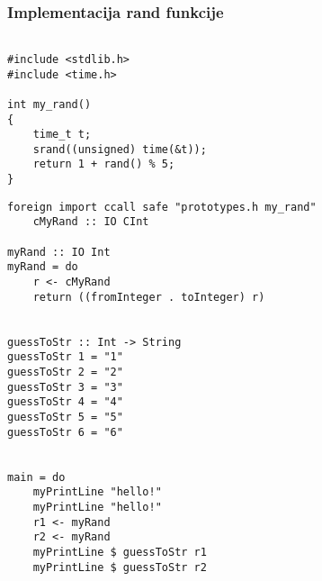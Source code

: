 \documentclass{beamer}
\begin{document}
\begin{frame}[fragile]
\frametitle{Implementacija rand funkcije}
\begin{lstlisting}

#include <stdlib.h>
#include <time.h>

int my_rand() 
{
	time_t t; 
	srand((unsigned) time(&t));
	return 1 + rand() % 5;
}

\end{lstlisting}
\end{frame}

\begin{frame}[fragile]
\begin{lstlisting}
foreign import ccall safe "prototypes.h my_rand"
    cMyRand :: IO CInt

myRand :: IO Int
myRand = do
    r <- cMyRand
    return ((fromInteger . toInteger) r)


guessToStr :: Int -> String
guessToStr 1 = "1"
guessToStr 2 = "2"
guessToStr 3 = "3"
guessToStr 4 = "4"
guessToStr 5 = "5"
guessToStr 6 = "6"


main = do
    myPrintLine "hello!"
    myPrintLine "hello!"
    r1 <- myRand
    r2 <- myRand
    myPrintLine $ guessToStr r1
    myPrintLine $ guessToStr r2

\end{lstlisting}
\end{frame}

\end{document}
